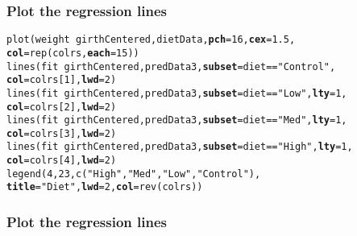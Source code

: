 \documentclass[color=usenames,dvipsnames]{beamer}\usepackage[]{graphicx}\usepackage[]{color}
\makeatletter
\newcommand{\hlnum}[1]{\textcolor[rgb]{0.69,0.494,0}{#1}}%
\newcommand{\hlstr}[1]{\textcolor[rgb]{0.749,0.012,0.012}{#1}}%
\newcommand{\hlopt}[1]{\textcolor[rgb]{0,0,0}{#1}}%
\newcommand{\hlstd}[1]{\textcolor[rgb]{0,0,0}{#1}}%
\newcommand{\hlkwc}[1]{\textcolor[rgb]{0,0,0}{\textbf{#1}}}%
\newcommand{\hlkwd}[1]{\textcolor[rgb]{0.004,0.004,0.506}{#1}}%
\newenvironment{kframe}{%
 \def\at@end@of@kframe{}%
 \ifinner\ifhmode%
  \def\at@end@of@kframe{\end{minipage}}%
  \begin{minipage}{\columnwidth}%
 \fi\fi%
 \def\FrameCommand##1{\hskip\@totalleftmargin \hskip-\fboxsep
 \colorbox{shadecolor}{##1}\hskip-\fboxsep
     \hskip-\linewidth \hskip-\@totalleftmargin \hskip\columnwidth}%
 \MakeFramed {\advance\hsize-\width
   \@totalleftmargin\z@ \linewidth\hsize
   \@setminipage}}%
 {\par\unskip\endMakeFramed%
 \at@end@of@kframe}
\newenvironment{knitrout}{}{} %
\makeatother
\begin{document}
\begin{frame}[fragile]
  \frametitle{Plot the regression lines}
\footnotesize %

\begin{knitrout}\footnotesize
{}\color{fgcolor}\begin{kframe}
\begin{alltt}
\hlkwd{plot}\hlstd{(weight} \hlopt{~} \hlstd{girthCentered, dietData,} \hlkwc{pch}\hlstd{=}\hlnum{16}\hlstd{,} \hlkwc{cex}\hlstd{=}\hlnum{1.5}\hlstd{,}
     \hlkwc{col}\hlstd{=}\hlkwd{rep}\hlstd{(colrs,} \hlkwc{each}\hlstd{=}\hlnum{15}\hlstd{))}
\hlkwd{lines}\hlstd{(fit} \hlopt{~} \hlstd{girthCentered, predData3,} \hlkwc{subset}\hlstd{=diet}\hlopt{==}\hlstr{"Control"}\hlstd{,}
      \hlkwc{col}\hlstd{=colrs[}\hlnum{1}\hlstd{],} \hlkwc{lwd}\hlstd{=}\hlnum{2}\hlstd{)}
\hlkwd{lines}\hlstd{(fit} \hlopt{~} \hlstd{girthCentered, predData3,} \hlkwc{subset}\hlstd{=diet}\hlopt{==}\hlstr{"Low"}\hlstd{,} \hlkwc{lty}\hlstd{=}\hlnum{1}\hlstd{,}
      \hlkwc{col}\hlstd{=colrs[}\hlnum{2}\hlstd{],} \hlkwc{lwd}\hlstd{=}\hlnum{2}\hlstd{)}
\hlkwd{lines}\hlstd{(fit} \hlopt{~} \hlstd{girthCentered, predData3,} \hlkwc{subset}\hlstd{=diet}\hlopt{==}\hlstr{"Med"}\hlstd{,} \hlkwc{lty}\hlstd{=}\hlnum{1}\hlstd{,}
      \hlkwc{col}\hlstd{=colrs[}\hlnum{3}\hlstd{],} \hlkwc{lwd}\hlstd{=}\hlnum{2}\hlstd{)}
\hlkwd{lines}\hlstd{(fit} \hlopt{~} \hlstd{girthCentered, predData3,} \hlkwc{subset}\hlstd{=diet}\hlopt{==}\hlstr{"High"}\hlstd{,} \hlkwc{lty}\hlstd{=}\hlnum{1}\hlstd{,}
      \hlkwc{col}\hlstd{=colrs[}\hlnum{4}\hlstd{],} \hlkwc{lwd}\hlstd{=}\hlnum{2}\hlstd{)}
\hlkwd{legend}\hlstd{(}\hlnum{4}\hlstd{,} \hlnum{23}\hlstd{,} \hlkwd{c}\hlstd{(}\hlstr{"High"}\hlstd{,} \hlstr{"Med"}\hlstd{,} \hlstr{"Low"}\hlstd{,} \hlstr{"Control"}\hlstd{),}
       \hlkwc{title}\hlstd{=}\hlstr{"Diet"}\hlstd{,} \hlkwc{lwd}\hlstd{=}\hlnum{2}\hlstd{,} \hlkwc{col}\hlstd{=}\hlkwd{rev}\hlstd{(colrs))}
\end{alltt}
\end{kframe}
\end{knitrout}
\end{frame}






\begin{frame}
  \frametitle{Plot the regression lines}
  \vspace{-0.5cm}
  \begin{center}
  \end{center}
\end{frame}
\end{document}
